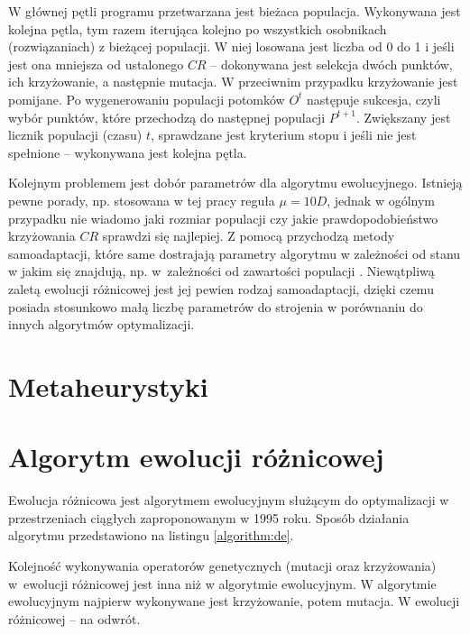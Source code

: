 \documentclass[a4paper,onecolumn,oneside,12pt,wide,floatssmall]{mwrep}
\theoremstyle{definition}
\theoremstyle{plain}%
\theoremstyle{remark}
\begin{document}
W głównej pętli programu przetwarzana jest bieżaca populacja. 
Wykonywana jest kolejna pętla, tym razem iterująca kolejno po wszystkich osobnikach 
(rozwiązaniach) z bieżącej populacji. W niej losowana jest liczba od 0 do 1 i jeśli jest ona mniejsza
od ustalonego $CR$ -- dokonywana jest selekcja dwóch punktów, ich krzyżowanie, a następnie mutacja.
W przeciwnim przypadku krzyżowanie jest pomijane.
Po wygenerowaniu populacji potomków $O^t$ następuje sukcesja, czyli wybór punktów, które przechodzą
do następnej populacji $P^{t+1}$. Zwiększany jest licznik populacji (czasu) $t$,
sprawdzane jest kryterium stopu i jeśli nie jest spełnione --
wykonywana jest kolejna pętla.
 
Kolejnym problemem jest dobór parametrów dla algorytmu ewolucyjnego. 
Istnieją pewne porady, np. stosowana w tej pracy reguła $\mu = 10D$, 
jednak w ogólnym przypadku nie wiadomo jaki rozmiar populacji czy jakie prawdopodobieństwo
krzyżowania $CR$ sprawdzi się najlepiej. Z pomocą przychodzą
metody samoadaptacji, które same dostrajają parametry algorytmu w zależności od stanu w jakim się
znajdują, np. w~zależności od zawartości populacji \cite{brest}.
Niewątpliwą zaletą ewolucji różnicowej jest jej pewien rodzaj samoadaptacji, dzięki
czemu posiada stosunkowo małą liczbę parametrów do strojenia w porównaniu do innych algorytmów
optymalizacji.

\section{Metaheurystyki}

\section{Algorytm ewolucji różnicowej}

Ewolucja różnicowa jest algorytmem ewolucyjnym służącym do optymalizacji
w przestrzeniach ciągłych zaproponowanym w 1995 roku. \cite{storn} Sposób działania algorytmu
przedstawiono na listingu \ref{algorithm:de}.

Kolejność wykonywania operatorów genetycznych (mutacji oraz krzyżowania) w~ewolucji różnicowej
jest inna niż w algorytmie ewolucyjnym.
W algorytmie ewolucyjnym najpierw wykonywane jest krzyżowanie, potem mutacja.
W ewolucji różnicowej -- na odwrót.

\usetikzlibrary{decorations.pathreplacing,calc}
\newcommand{\tikzmark}[1]{\tikz[overlay,remember picture] \node (#1) {};}

\newcommand*{\AddNote}[4]{%
    \begin{tikzpicture}[overlay, remember picture]
        \draw [decoration={brace,amplitude=0.5em},decorate,thick]
            ($(#3)!(#1.north)!($(#3)-(0,1)$)$) --  
            ($(#3)!(#2.south)!($(#3)-(0,1)$)$)
                node [align=center, text width=2.5cm, pos=0.5, anchor=west] {#4};
    \end{tikzpicture}
}%
\end{document}
